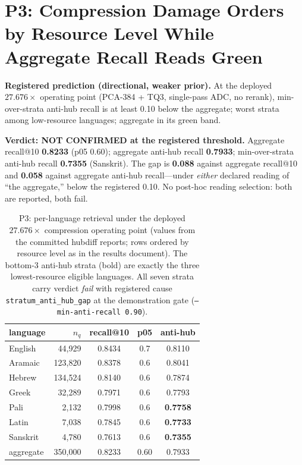 \documentclass[11pt]{article}
\begin{document}
\section{P3: Compression Damage Orders by Resource Level While Aggregate
Recall Reads Green}
\label{sec:p3}

\textbf{Registered prediction (directional, weaker prior).} At the
deployed $27.676\times$ operating point (PCA-384 + TQ3, single-pass ADC,
no rerank), min-over-strata anti-hub recall is at least 0.10 below the
aggregate; worst strata among low-resource languages; aggregate in its
green band.

\textbf{Verdict: NOT CONFIRMED at the registered threshold.} Aggregate
recall@10 \textbf{0.8233} (p05 0.60); aggregate anti-hub recall
\textbf{0.7933}; min-over-strata anti-hub recall \textbf{0.7355}
(Sanskrit). The gap is \textbf{0.088} against aggregate recall@10 and
\textbf{0.058} against aggregate anti-hub recall---under \emph{either}
declared reading of ``the aggregate,'' below the registered 0.10. No
post-hoc reading selection: both are reported, both fail.

\begin{table}[t]
\centering
\small
\setlength{\tabcolsep}{4pt}
\begin{tabular}{lrccc}
\toprule
language & $n_q$ & recall@10 & p05 & anti-hub \\
\midrule
English  &  44{,}929 & 0.8434 & 0.7 & 0.8110 \\
Aramaic  & 123{,}820 & 0.8378 & 0.6 & 0.8041 \\
Hebrew   & 134{,}524 & 0.8140 & 0.6 & 0.7874 \\
Greek    &  32{,}289 & 0.7971 & 0.6 & 0.7793 \\
Pali     &   2{,}132 & 0.7998 & 0.6 & \textbf{0.7758} \\
Latin    &   7{,}038 & 0.7845 & 0.6 & \textbf{0.7733} \\
Sanskrit &   4{,}780 & 0.7613 & 0.6 & \textbf{0.7355} \\
\midrule
aggregate & 350{,}000 & 0.8233 & 0.60 & 0.7933 \\
\bottomrule
\end{tabular}
\caption{P3: per-language retrieval under the deployed $27.676\times$
compression operating point (values from the committed hubdiff reports;
rows ordered by resource level as in the results document). The bottom-3
anti-hub strata (bold) are exactly the three lowest-resource eligible
languages. All seven strata carry verdict \emph{fail} with registered
cause \texttt{stratum\_anti\_hub\_gap} at the demonstration gate
(\texttt{--min-anti-recall 0.90}).}
\label{tab:p3}
\end{table}
\end{document}
